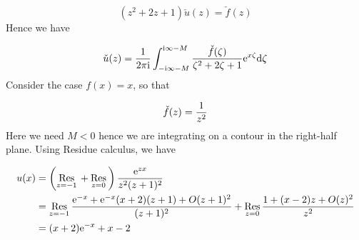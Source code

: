 \documentclass[12pt,landscape]{article}
\def\D{ {\rm d} }
\def\I{ {\rm i} }
\def\E{ {\rm e} }
\def\Res_#1{\underset{#1}{\rm Res}\,}
\begin{document}
{\[
(z^2 + 2z + 1) \check u(z) = \check f(z)
\]
Hence we have

\[
\check u(z) = {1 \over 2 \pi \I}\int_{-\I\infty-M}^{\I \infty-M} {\check f(\zeta) \over \zeta^2 + 2\zeta+1} \E^{x \zeta} \D \zeta
\]
Consider the case $f(x) = x$, so that

\[
\check f(z) = {1 \over z^2}
\]
Here we need $M < 0$ hence we are integrating on a contour in the right-half plane.  Using Residue calculus, we have


\begin{align*}
u(x) &= \left(\Res_{z = -1} + \Res_{z=0}\right) {\E^{z x} \over z^2 (z +1)^2} \\
&= \Res_{z = -1}  {\E^{-x} +\E^{-x}(x+2) (z+1) +O(z+1)^2 \over  (z +1)^2} + \Res_{z=0} {1 + (x-2) z +O(z)^2 \over  z^2}  \\
 &= (x+2)\E^{-x} + x-2
 \end{align*}
 \newpage
}
\end{document}
